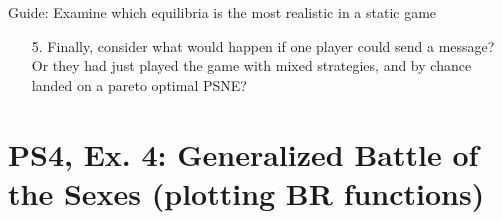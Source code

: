\begin{frame}{Guide: Examine which equilibria is the most realistic in a static game}
\begin{multicols}{2}
\begin{itemize}
\begin{itemize}
          \item[ad. 2] If a strategy has severe punishment for miscoordination, a risk averse player would most likely want to look for a strategy with lower possible punishment.
      \end{itemize}
      \item[5.] Finally, consider what would happen if one player could send a message? Or they had just played the game with mixed strategies, and by chance landed on a pareto optimal PSNE?
    \end{itemize}
    \vfill\null
  \end{multicols}
\end{frame}


\section{PS4, Ex. 4: Generalized Battle of the Sexes (plotting BR functions)}

